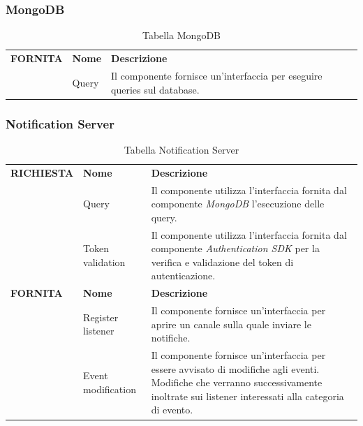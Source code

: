 \documentclass{article}
\begin{document}
\subsubsection{MongoDB}

\begin{table}[htbp]
    \centering
    \renewcommand{\arraystretch}{1.3} %
    \begin{tabularx}{\textwidth}{| l | l | X |}
        \Xhline{2pt}
        \textbf{FORNITA} & \textbf{Nome} & \textbf{Descrizione} \\
        \Xhline{2pt}
         & Query & Il componente fornisce un'interfaccia per eseguire queries sul database. \\
        \hline
    \end{tabularx}
    \caption{Tabella MongoDB}
\end{table}

\clearpage

\subsubsection{Notification Server}

\begin{table}[htbp]
    \centering
    \renewcommand{\arraystretch}{1.3} %
    \begin{tabularx}{\textwidth}{| l | l | X |}
        \Xhline{2pt}
        \textbf{RICHIESTA} & \textbf{Nome} & \textbf{Descrizione} \\
        \Xhline{2pt}
         & Query & Il componente utilizza l'interfaccia fornita dal componente \textit{MongoDB} l'esecuzione delle query. \\
        \hline
         & Token validation & Il componente utilizza l'interfaccia fornita dal componente \textit{Authentication SDK} per la verifica e validazione del token di autenticazione. \\
        \Xhline{2pt}
        \textbf{FORNITA} & \textbf{Nome} & \textbf{Descrizione} \\
        \Xhline{2pt}
         & Register listener & Il componente fornisce un'interfaccia per aprire un canale sulla quale inviare le notifiche. \\
        \hline
         & Event modification & Il componente fornisce un'interfaccia per essere avvisato di modifiche agli eventi. Modifiche che verranno successivamente inoltrate sui listener interessati alla categoria di evento. \\
        \hline
    \end{tabularx}
    \caption{Tabella Notification Server}
\end{table}
\end{document}
